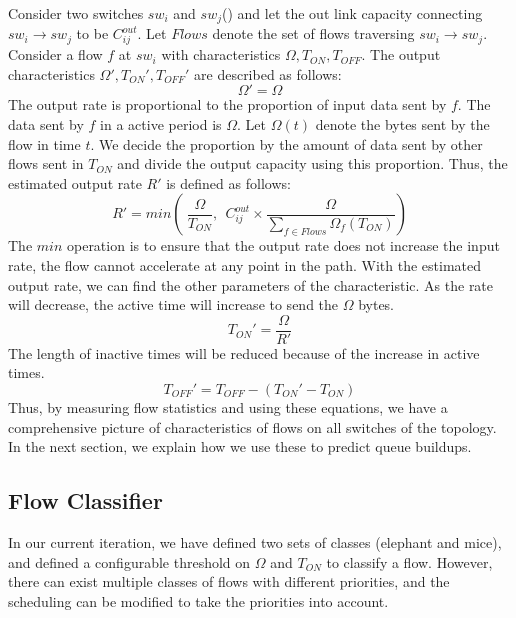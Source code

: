 Consider two switches $sw_i$ and $sw_j$() and let the out link
capacity connecting $sw_i \rightarrow sw_j$ to be $C_{ij}^{out}$. Let $Flows$
denote the set of flows traversing $sw_i \rightarrow sw_j$. Consider a flow $f$ at $sw_i$ 
with characteristics $\Omega, T_{ON}, T_{OFF}$. The output characteristics $\Omega',T_{ON}', T_{OFF}'$  are described as follows: 
\begin{equation}
	\Omega' = \Omega
\end{equation} 
The output rate is proportional to the proportion of input data sent by $f$. The data sent by
$f$ in a active period is $\Omega$. Let $\Omega(t)$ denote the bytes sent by the flow in time $t$.
We decide the proportion by the amount of data sent by other flows sent in $T_{ON}$ and
divide the output capacity using this proportion. Thus, the estimated output rate $R'$ is defined as follows: 
\begin{equation}
	R' = min(\ \frac{\Omega}{T_{ON}}, \ \  C_{ij}^{out} \times \frac{\Omega}{\sum_{f \in Flows} \Omega_f(T_{ON}) })
\end{equation}
The $min$ operation is to ensure that the output rate does not increase the input rate,
the flow cannot accelerate at any point in the path. With the estimated output rate, we can find the other parameters of the characteristic. As the rate will decrease, the active time will increase to send the $\Omega$ bytes.
\begin{equation}
	T_{ON}' = \frac{\Omega}{R'}
\end{equation}
The length of inactive times will be reduced because of the increase in active times. 
\begin{equation}
	T_{OFF}' = T_{OFF} - ( T_{ON}'  - T_{ON} )
\end{equation}
Thus, by measuring flow statistics and using these equations, we have a comprehensive picture of characteristics of flows on all switches of the topology. In the next section, we explain how we use these to predict queue buildups.

\subsection{Flow Classifier}
In our current iteration, we have defined two sets of classes (elephant and mice), and defined 
a configurable threshold on $\Omega$ and $T_{ON}$ to classify a flow. However, there can
exist multiple classes of flows with different priorities, and the scheduling can be modified to take the priorities into account.

